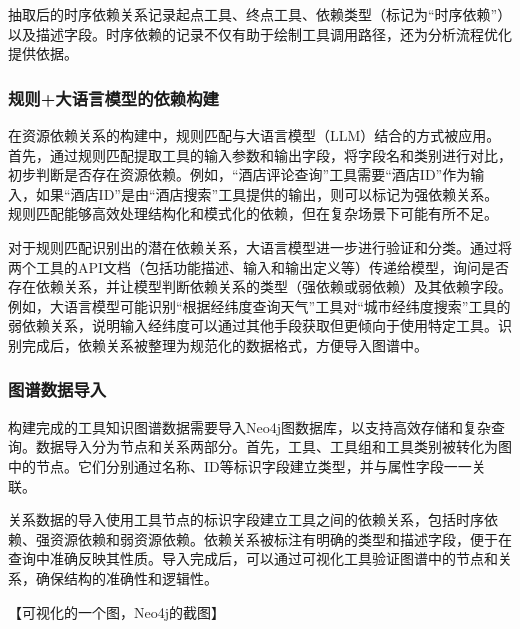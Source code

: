 抽取后的时序依赖关系记录起点工具、终点工具、依赖类型（标记为“时序依赖”）以及描述字段。时序依赖的记录不仅有助于绘制工具调用路径，还为分析流程优化提供依据。

\subsubsection{规则+大语言模型的依赖构建}

在资源依赖关系的构建中，规则匹配与大语言模型（LLM）结合的方式被应用。首先，通过规则匹配提取工具的输入参数和输出字段，将字段名和类别进行对比，初步判断是否存在资源依赖。例如，“酒店评论查询”工具需要“酒店ID”作为输入，如果“酒店ID”是由“酒店搜索”工具提供的输出，则可以标记为强依赖关系。规则匹配能够高效处理结构化和模式化的依赖，但在复杂场景下可能有所不足。

对于规则匹配识别出的潜在依赖关系，大语言模型进一步进行验证和分类。通过将两个工具的API文档（包括功能描述、输入和输出定义等）传递给模型，询问是否存在依赖关系，并让模型判断依赖关系的类型（强依赖或弱依赖）及其依赖字段。例如，大语言模型可能识别“根据经纬度查询天气”工具对“城市经纬度搜索”工具的弱依赖关系，说明输入经纬度可以通过其他手段获取但更倾向于使用特定工具。识别完成后，依赖关系被整理为规范化的数据格式，方便导入图谱中。

\subsubsection{图谱数据导入}

构建完成的工具知识图谱数据需要导入Neo4j图数据库，以支持高效存储和复杂查询。数据导入分为节点和关系两部分。首先，工具、工具组和工具类别被转化为图中的节点。它们分别通过名称、ID等标识字段建立类型，并与属性字段一一关联。

关系数据的导入使用工具节点的标识字段建立工具之间的依赖关系，包括时序依赖、强资源依赖和弱资源依赖。依赖关系被标注有明确的类型和描述字段，便于在查询中准确反映其性质。导入完成后，可以通过可视化工具验证图谱中的节点和关系，确保结构的准确性和逻辑性。

【可视化的一个图，Neo4j的截图】



